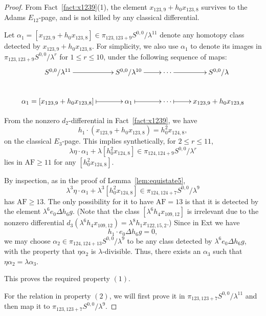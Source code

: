 \documentclass{amsart}
\numberwithin{equation}{section}
\newcommand{\AF}{\mathrm{AF}}
\begin{document}
\begin{proof}
From Fact~\ref{fact:x1239}(1), the element $x_{123,9}+h_0x_{123,8}$ survives to the Adams $E_{12}$-page, and is not killed by any classical differential.

Let $\alpha_1 = [x_{123,9}+h_0x_{123,8}] \in \pi_{123,123+9} S^{0,0}/\lambda^{11}$ denote any homotopy class detected by $x_{123,9}+h_0x_{123,8}$. For simplicity, we also use  $\alpha_1$ to denote its images in $\pi_{123,123+9} S^{0,0}/\lambda^r$ for $1 \leq r \leq 10$, under the following sequence of maps:
$$
\xymatrix{
S^{0,0}/\lambda^{11} \ar[r] & S^{0,0}/\lambda^{10} \ar[r] & \cdots \ar[r] & S^{0,0}/\lambda \\
\alpha_1 = [x_{123,9}+h_0x_{123,8}] \ar@{|->}[r] & \alpha_1 \ar@{|->}[r] & \cdots \ar@{|->}[r] & x_{123,9}+h_0x_{123,8}
}$$

From the nonzero $d_2$-differential in Fact~\ref{fact:x1239},  we have 
$$h_1 \cdot (x_{123,9}+h_0x_{123,8}) = h_0^2x_{124,8},$$
on the classical $E_3$-page. This implies synthetically, for $2 \leq r \leq 11$,
$$\lambda \eta \cdot \alpha_1 + \lambda [h_0^2 x_{124,8}] \in \pi_{124,124+9} S^{0,0}/\lambda^r$$
lies in $\AF \ge 11$ for any $[h_0^2 x_{124,8}]$.


By inspection, as in the proof of Lemma~\ref{lem:equistate5}, $$\lambda^3 \eta \cdot \alpha_1 + \lambda^3 [h_0^2 x_{124,8}] \in \pi_{124,124+7} S^{0,0}/\lambda^9$$
has $\AF \ge 13$. The only possibility for it to have $\AF=13$ is that it is detected by the element $\lambda^6 e_0 \Delta h_6g$. (Note that the class $[\lambda^6 h_4 x_{109,12}]$ is irrelevant due to the nonzero differential $d_3(\lambda^6 h_4 x_{109,12}) = \lambda^8 h_1x_{122,15,2}$.) Since in Ext we have 
$$h_1 \cdot e_0 \Delta h_6g = 0,$$
we may choose $\alpha_2 \in \pi_{124,124+13} S^{0,0}/\lambda^9$ to be any class detected by $\lambda^6 e_0 \Delta h_6g$, with the property that $\eta \alpha_2$ is $\lambda$-divisible. Thus, there exists an $\alpha_3$ such that $\eta \alpha_2 = \lambda  \alpha_3$.

This proves the required property $(1)$.

For the relation in property $(2)$, we will first prove it in $\pi_{123,123+7} S^{0,0}/\lambda^{11}$ and then map it to $\pi_{123,123+7} S^{0,0}/\lambda^9$.


\end{proof}
\end{document}
